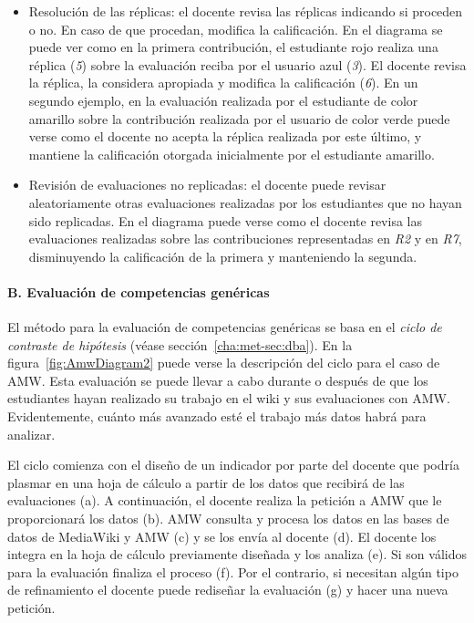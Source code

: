 			\begin{itemize}
				\item Resolución de las réplicas: el docente revisa las réplicas indicando si proceden o no. En caso de que procedan, modifica la calificación. En el diagrama se puede ver como en la primera contribución, el estudiante rojo realiza una réplica (\emph{5}) sobre la evaluación reciba por el usuario azul (\emph{3}). El docente revisa la réplica, la considera apropiada y modifica la calificación (\emph{6}). En un segundo ejemplo, en la evaluación realizada por el estudiante de color amarillo sobre la contribución realizada por el usuario de color verde puede verse como el docente no acepta la réplica realizada por este último, y mantiene la calificación otorgada inicialmente por el estudiante amarillo.
				\item Revisión de evaluaciones no replicadas: el docente puede revisar aleatoriamente otras evaluaciones realizadas por los estudiantes que no hayan sido replicadas. En el diagrama puede verse como el docente revisa las evaluaciones realizadas sobre las contribuciones representadas en \emph{R2} y en \emph{R7}, disminuyendo la calificación de la primera y manteniendo la segunda.
			\end{itemize}

			\paragraph*{B. Evaluación de competencias genéricas}

			El método para la evaluación de competencias genéricas se basa en el \emph{ciclo de contraste de hipótesis} (véase sección~\ref{cha:met-sec:dba}). En la figura~\ref{fig:AmwDiagram2} puede verse la descripción del ciclo para el caso de AMW. Esta evaluación se puede llevar a cabo durante o después de que los estudiantes hayan realizado su trabajo en el wiki y sus evaluaciones con AMW. Evidentemente, cuánto más avanzado esté el trabajo más datos habrá para analizar. 

			El ciclo comienza con el diseño de un indicador por parte del docente que podría plasmar en una hoja de cálculo a partir de los datos que recibirá de las evaluaciones (a). A continuación, el docente realiza la petición a AMW que le proporcionará los datos (b). AMW consulta y procesa los datos en las bases de datos de MediaWiki y AMW (c) y se los envía al docente (d). El docente los integra en la hoja de cálculo previamente diseñada y los analiza (e). Si son válidos para la evaluación finaliza el proceso (f). Por el contrario, si necesitan algún tipo de refinamiento el docente puede rediseñar la evaluación (g) y hacer una nueva petición.

